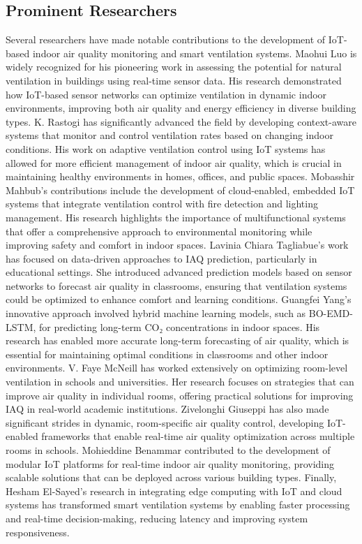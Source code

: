 \subsection{Prominent Researchers}  
Several researchers have made notable contributions to the development of IoT-based indoor air quality monitoring and smart ventilation systems. Maohui Luo is widely recognized for his pioneering work in assessing the potential for natural ventilation in buildings using real-time sensor data. His research demonstrated how IoT-based sensor networks can optimize ventilation in dynamic indoor environments, improving both air quality and energy efficiency in diverse building types. K. Rastogi has significantly advanced the field by developing context-aware systems that monitor and control ventilation rates based on changing indoor conditions. His work on adaptive ventilation control using IoT systems has allowed for more efficient management of indoor air quality, which is crucial in maintaining healthy environments in homes, offices, and public spaces. Mobasshir Mahbub’s contributions include the development of cloud-enabled, embedded IoT systems that integrate ventilation control with fire detection and lighting management. His research highlights the importance of multifunctional systems that offer a comprehensive approach to environmental monitoring while improving safety and comfort in indoor spaces. Lavinia Chiara Tagliabue’s work has focused on data-driven approaches to IAQ prediction, particularly in educational settings. She introduced advanced prediction models based on sensor networks to forecast air quality in classrooms, ensuring that ventilation systems could be optimized to enhance comfort and learning conditions. Guangfei Yang’s innovative approach involved hybrid machine learning models, such as BO-EMD-LSTM, for predicting long-term CO₂ concentrations in indoor spaces. His research has enabled more accurate long-term forecasting of air quality, which is essential for maintaining optimal conditions in classrooms and other indoor environments. V. Faye McNeill has worked extensively on optimizing room-level ventilation in schools and universities. Her research focuses on strategies that can improve air quality in individual rooms, offering practical solutions for improving IAQ in real-world academic institutions. Zivelonghi Giuseppi has also made significant strides in dynamic, room-specific air quality control, developing IoT-enabled frameworks that enable real-time air quality optimization across multiple rooms in schools. Mohieddine Benammar contributed to the development of modular IoT platforms for real-time indoor air quality monitoring, providing scalable solutions that can be deployed across various building types. Finally, Hesham El-Sayed’s research in integrating edge computing with IoT and cloud systems has transformed smart ventilation systems by enabling faster processing and real-time decision-making, reducing latency and improving system responsiveness.


